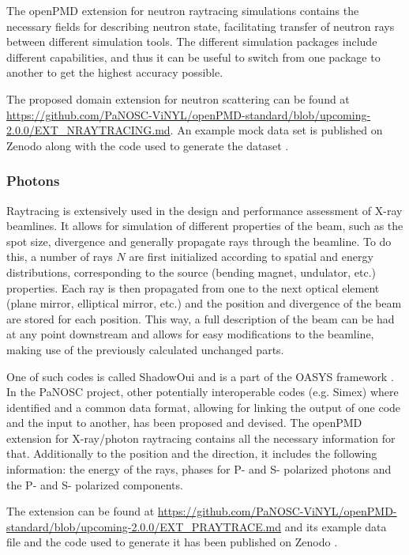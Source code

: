 \documentclass[11pt, a4paper]{article}
\begin{document}
The openPMD extension for neutron raytracing simulations contains the necessary fields for describing neutron state,
facilitating transfer of neutron rays between different simulation tools. The different simulation packages include different
capabilities, and thus it can be useful to switch from one package to another to get the highest accuracy possible.

The proposed domain extension for neutron scattering can be found at
\url{https://github.com/PaNOSC-ViNYL/openPMD-standard/blob/upcoming-2.0.0/EXT_NRAYTRACING.md}.
An example mock data set is published on Zenodo along with the code used to generate the dataset \cite{Bertelsen:zenodo2019}.

\subsubsection{Photons}
Raytracing is extensively used in the design and performance assessment of X-ray beamlines. It allows for simulation of different properties of the beam, such as the spot size, divergence and generally propagate rays through the beamline. To do this, a number of rays $N$ are first initialized according to spatial and energy distributions, corresponding to the source (bending magnet, undulator, etc.) properties. Each ray is then propagated from one to the next optical element (plane mirror, elliptical mirror, etc.) and the position and divergence of the beam are stored for each position. This way, a full description of the beam can be had at any point downstream and allows for easy modifications to the beamline, making use of the previously calculated unchanged parts.

One of such codes is called ShadowOui and is a part of the OASYS framework \cite{Rebuffi2016}. In the PaNOSC project, other potentially interoperable codes (e.g. Simex) where identified and a common data format, allowing for linking the output of one code and the input to another, has been proposed and devised. The openPMD extension for X-ray/photon raytracing contains all the necessary information for that. Additionally to the position and the direction, it includes the following information: the energy of the rays, phases for P- and S- polarized photons and the P- and S- polarized components.

The extension can be found at \url{https://github.com/PaNOSC-ViNYL/openPMD-standard/blob/upcoming-2.0.0/EXT_PRAYTRACE.md} and its example data file and the code used to generate it has been published on Zenodo \cite{Hafner:zenodo2019}.
\end{document}
